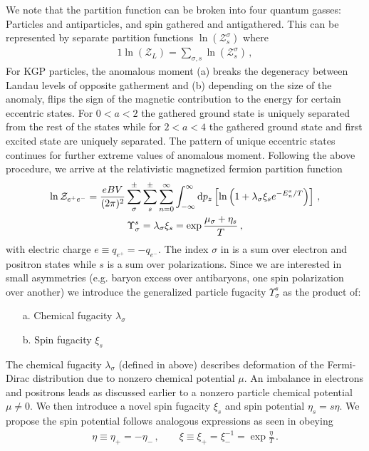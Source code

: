 We note that the partition function can be broken into four quantum gasses: Particles and antiparticles, and spin gathered and antigathered. This can be represented by separate partition functions $\ln\left(\mathcal{Z}^{\sigma}_{s}\right)$ where
\begin{alignat}{1}
    \label{FourGasses} \ln\left(\mathcal{Z}_{L}\right)=\sum_{\sigma,s}\ln\left(\mathcal{Z}^{\sigma}_{s}\right)\,,
\end{alignat}
For KGP particles, the anomalous moment (a) breaks the degeneracy between Landau levels of opposite gatherment and (b) depending on the size of the anomaly, flips the sign of the magnetic contribution to the energy for certain eccentric states. For $0<a<2$ the gathered ground state is uniquely separated from the rest of the states while for $2<a<4$ the gathered ground state and first excited state are uniquely separated. The pattern of unique eccentric states continues for further extreme values of anomalous moment. Following the above procedure, we arrive at the relativistic magnetized fermion partition function
\begin{gather}
 \label{partition}
 \ln{\cal Z}_{e^{+}e^{-}}=\frac{eBV}{(2\pi)^{2}}\sum_{\sigma}^{\pm}\sum_{s}^{\pm}\sum_{n=0}^{\infty}\int_{-\infty}^{\infty}{\rm d}p_{z}
 \left[\ln\left(1+\lambda_{\sigma}\xi_{s}e^{-E_{n}^{s}/T}\right)\right]\,,\\
 \Upsilon_{\sigma}^{s}=\lambda_{\sigma}\xi_{s} = \exp{\frac{\mu_{\sigma}+\eta_{s}}{T}}\,,
\end{gather}
with electric charge $e\equiv q_{e^{+}}=-q_{e^{-}}$. The index $\sigma$ in  is a sum over electron and positron states while $s$ is a sum over polarizations. Since we are interested in small asymmetries (e.g. baryon excess over antibaryons, one spin polarization over another) we introduce the generalized particle fugacity $\Upsilon_{\sigma}^{s}$ as the product of:
\begin{itemize}[nosep]
 \item[a.] Chemical fugacity $\lambda_{\sigma}$
 \item[b.] Spin fugacity $\xi_{s}$
\end{itemize}
The chemical fugacity $\lambda_{\sigma}$ (defined in  above) describes deformation of the Fermi-Dirac distribution due to nonzero chemical potential $\mu$. An imbalance in electrons and positrons leads as discussed earlier to a nonzero particle chemical potential $\mu\neq0$. We then introduce a novel spin fugacity $\xi_{s}$ and spin potential $\eta_{s}=s\eta$. We propose the spin potential follows analogous expressions as seen in  obeying
\begin{gather}
 \label{spotential}
 \eta\equiv\eta_{+}=-\eta_{-}\,,\qquad
 \xi\equiv\xi_{+}=\xi_{-}^{-1}= \exp{\frac{\eta}{T}}\,.
\end{gather}

